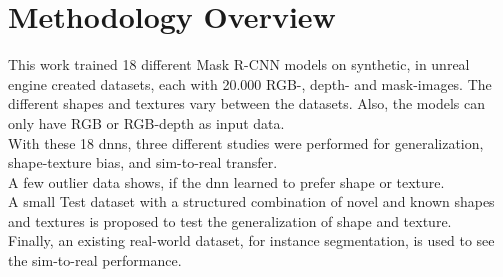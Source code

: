 	
	
	\section{Methodology Overview}
	\label{sec:methodology-overview}
		This work trained 18 different Mask R-CNN \cite{Kaiming2017} models on synthetic, in unreal engine \cite{Romero2022} created datasets, each with 20.000 RGB-, depth- and mask-images. The different shapes and textures vary between the datasets. Also, the models can only have RGB or RGB-depth as input data.\\
		With these 18 \ac{dnn}s, three different studies were performed for generalization, shape-texture bias, and sim-to-real transfer.\\
		A few outlier data shows, if the \ac{dnn} learned to prefer shape or texture.\\
		A small Test dataset with a structured combination of novel and known shapes and textures is proposed to test the generalization of shape and texture.\\
		Finally, an existing real-world dataset, for instance segmentation, is used to see the sim-to-real performance.
		
	
	
